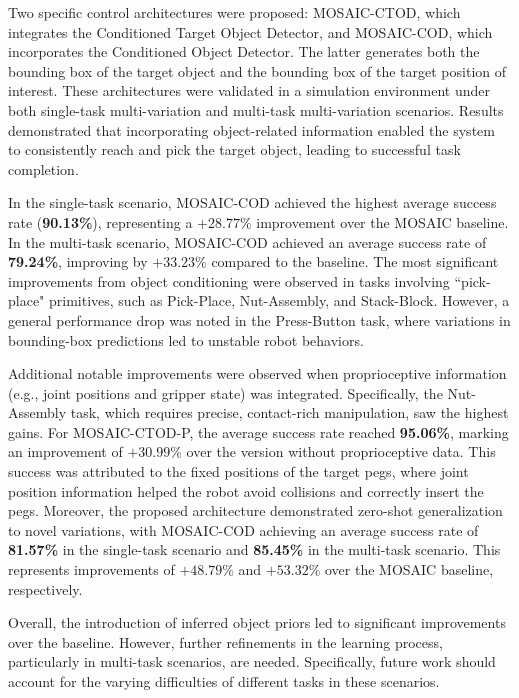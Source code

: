 Two specific control architectures were proposed: MOSAIC-CTOD, which integrates the Conditioned Target Object Detector, and MOSAIC-COD, which incorporates the Conditioned Object Detector. The latter generates both the bounding box of the target object and the bounding box of the target position of interest. These architectures were validated in a simulation environment under both single-task multi-variation and multi-task multi-variation scenarios. Results demonstrated that incorporating object-related information enabled the system to consistently reach and pick the target object, leading to successful task completion.

In the single-task scenario, MOSAIC-COD achieved the highest average success rate (\textbf{90.13\%}), representing a $+28.77\%$ improvement over the MOSAIC baseline. In the multi-task scenario, MOSAIC-COD achieved an average success rate of \textbf{79.24\%}, improving by $+33.23\%$ compared to the baseline. The most significant improvements from object conditioning were observed in tasks involving ``pick-place" primitives, such as Pick-Place, Nut-Assembly, and Stack-Block. However, a general performance drop was noted in the Press-Button task, where variations in bounding-box predictions led to unstable robot behaviors.

Additional notable improvements were observed when proprioceptive information (e.g., joint positions and gripper state) was integrated. Specifically, the Nut-Assembly task, which requires precise, contact-rich manipulation, saw the highest gains. For MOSAIC-CTOD-P, the average success rate reached \textbf{95.06\%}, marking an improvement of $+30.99\%$ over the version without proprioceptive data. This success was attributed to the fixed positions of the target pegs, where joint position information helped the robot avoid collisions and correctly insert the pegs. Moreover, the proposed architecture demonstrated zero-shot generalization to novel variations, with MOSAIC-COD achieving an average success rate of \textbf{81.57\%} in the single-task scenario and \textbf{85.45\%} in the multi-task scenario. This represents improvements of $+48.79\%$ and $+53.32\%$ over the MOSAIC baseline, respectively.

Overall, the introduction of inferred object priors led to significant improvements over the baseline. However, further refinements in the learning process, particularly in multi-task scenarios, are needed. Specifically, future work should account for the varying difficulties of different tasks in these scenarios.